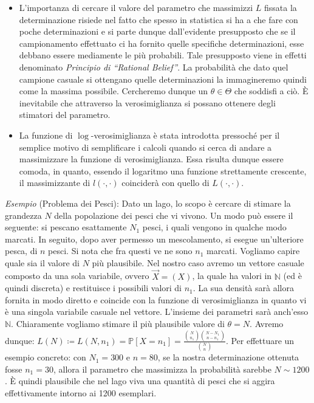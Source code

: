 \begin{itemize}
\item L'importanza di cercare il valore del parametro che massimizzi $L$ fissata la determinazione risiede nel fatto che spesso in statistica si ha a che fare con poche determinazioni e si parte dunque dall'evidente presupposto che se il campionamento effettuato ci ha fornito quelle specifiche determinazioni, esse debbano essere mediamente le più probabili. Tale presupposto viene in effetti denominato \textit{Principio di ``Rational Belief''}. La probabilità che dato quel campione casuale si ottengano quelle determinazioni la immagineremo quindi come la massima possibile. Cercheremo dunque un $\theta\in \Theta$ che soddisfi a ciò. È inevitabile che attraverso la verosimiglianza si possano ottenere degli stimatori del parametro.

\item La funzione di $\log$-verosimiglianza è stata introdotta pressoché per il semplice motivo di semplificare i calcoli quando si cerca di andare a massimizzare la funzione di verosimiglianza. Essa risulta dunque essere comoda, in quanto, essendo il logaritmo una funzione strettamente crescente, il massimizzante di $l(\cdot,\cdot)$ coinciderà con quello di $L(\cdot,\cdot)$.
\end{itemize}
\textit{Esempio} (Problema dei Pesci): Dato un lago, lo scopo è cercare di stimare la grandezza $N$ della popolazione dei pesci che vi vivono. Un modo può essere il seguente: si pescano esattamente $N_1$ pesci, i quali vengono in qualche modo marcati. In seguito, dopo aver permesso un mescolamento, si esegue un'ulteriore pesca, di $n$ pesci. Si nota che fra questi ve ne sono $n_1$ marcati. Vogliamo capire quale sia il valore di $N$ più plausibile. Nel nostro caso avremo un vettore casuale composto da una sola variabile, ovvero $\vec{X}=(X)$, la quale ha valori in $\mathbb{N}$ (ed è quindi discreta) e restituisce i possibili valori di $n_1$. La sua densità sarà allora fornita in modo diretto e coincide con la funzione di verosimiglianza in quanto vi è una singola variabile casuale nel vettore. L'insieme dei parametri sarà anch'esso $\mathbb{N}$. Chiaramente vogliamo stimare il più plausibile valore di $\theta=N$. Avremo dunque: 
$L(N)\coloneqq L(N,n_1)=\mathbb{P}[X=n_1]=\frac{\binom{N}{n_1}\binom{N-N_1}{n-n_1}}{\binom{N}{n}}.$ Per effettuare un esempio concreto: con $N_1=300$ e $n=80$, se la nostra determinazione ottenuta fosse $n_1=30$, allora il parametro che massimizza la probabilità sarebbe $N\sim 1200$. È quindi plausibile che nel lago viva una quantità di pesci che si aggira effettivamente intorno ai 1200 esemplari.
